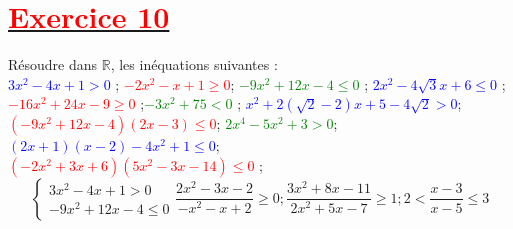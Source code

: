\documentclass[12pt]{article}
\begin{document}
\section*{\underline{\textbf{\textcolor{red}{Exercice 10}}}}
Résoudre dans $\mathbb{R}$, les inéquations suivantes :\\
\textcolor{blue}{$3x^{2}-4x+1>0$} ; \textcolor{red}{$-2x^{2}-x+1\geq 0$};
\textcolor{green}{$-9x^{2}+12x-4\leq 0$} ; \textcolor{blue}{$2x^{2}-4\sqrt{3}x+6\leq 0$} ; 
\textcolor{red}{$-16x^{2}+24x-9 \geq 0$} ;\textcolor{green}{$-3x^{2}+75<0$} ;
\textcolor{blue}{$x^{2}+2(\sqrt{2}-2)x+5-4\sqrt{2}>0$};
\textcolor{red}{$(-9x^{2}+12x-4)(2x-3)\leq 0$};
\textcolor{green}{$2x^{4}-5x^{2}+3>0$};\textcolor{blue}{$(2x+1)(x-2)-4x^{2}+1\leq 0$};\\
\textcolor{red}{$(-2x^{2}+3x+6)(5x^{2}-3x-14)\leq 0$} ;
\begin{equation*}
\begin{cases}
3x^{2}-4x+1>0 \\
-9x^{2}+12x-4\leq 0
\end{cases}
\frac{2x^{2}-3x-2}{-x^{2}-x+2}\geq 0 ; 
\frac{3x^{2}+8x-11}{2x^{2}+5x-7}\geq 1 ;
2<\frac{x-3}{x-5}\leq 3
\end{equation*}
\end{document}
